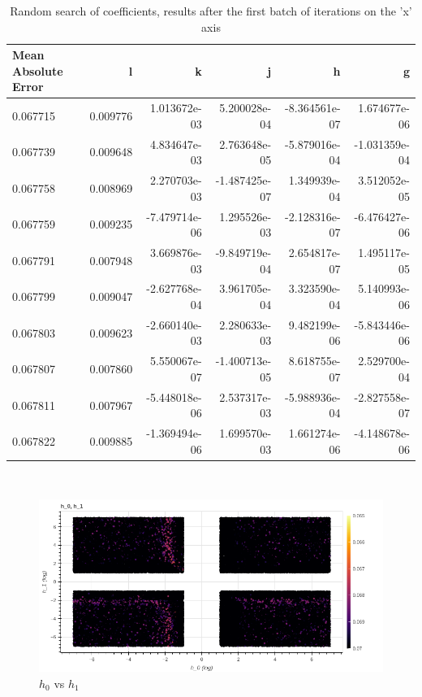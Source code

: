\documentclass[openany]{article}
\begin{document}
\begin{table}[!h]
    \centering
\begin{tabular}{lrrrrr}
\toprule
Mean Absolute Error &         l &             k &             j &             h &             g \\
\hline
\hline
\midrule
0.067715 &  0.009776 &  1.013672e-03 &  5.200028e-04 & -8.364561e-07 &  1.674677e-06 \\
0.067739 &  0.009648 &  4.834647e-03 &  2.763648e-05 & -5.879016e-04 & -1.031359e-04 \\
0.067758 &  0.008969 &  2.270703e-03 & -1.487425e-07 &  1.349939e-04 &  3.512052e-05 \\
0.067759 &  0.009235 & -7.479714e-06 &  1.295526e-03 & -2.128316e-07 & -6.476427e-06 \\
0.067791 &  0.007948 &  3.669876e-03 & -9.849719e-04 &  2.654817e-07 &  1.495117e-05 \\
0.067799 &  0.009047 & -2.627768e-04 &  3.961705e-04 &  3.323590e-04 &  5.140993e-06 \\
0.067803 &  0.009623 & -2.660140e-03 &  2.280633e-03 &  9.482199e-06 & -5.843446e-06 \\
0.067807 &  0.007860 &  5.550067e-07 & -1.400713e-05 &  8.618755e-07 &  2.529700e-04 \\
0.067811 &  0.007967 & -5.448018e-06 &  2.537317e-03 & -5.988936e-04 & -2.827558e-07 \\
0.067822 &  0.009885 & -1.369494e-06 &  1.699570e-03 &  1.661274e-06 & -4.148678e-06 \\
\hline
\hline

\bottomrule
\end{tabular}
\caption{Random search of coefficients, results after the first batch of iterations on the 'x' axis}
    \label{tab:my_label}
\end{table} \\








\begin{figure}[!h]
    \centering
    \includegraphics[width=\textwidth]{h1.png}
    \caption{\( h_0\) vs \(h_1\)}
    \label{fig:my_label}
\end{figure}
\end{document}
